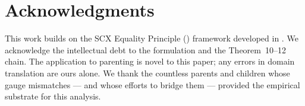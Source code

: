 \documentclass[11pt,a4paper]{article}
\begin{document}
\section*{Acknowledgments}

This work builds on the SCX Equality Principle () framework developed in \cite{scx_moe_gauge}. We acknowledge the intellectual debt to the formulation and the Theorem~10--12 chain. The application to parenting is novel to this paper; any errors in domain translation are ours alone. We thank the countless parents and children whose gauge mismatches — and whose efforts to bridge them — provided the empirical substrate for this analysis.

\end{document}
